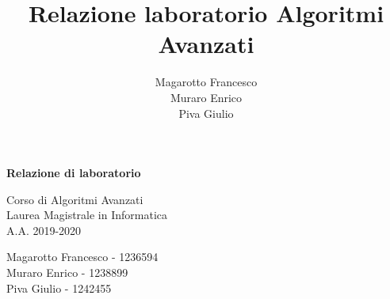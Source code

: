 \documentclass[a4paper]{article}
\title{Relazione laboratorio Algoritmi Avanzati}
\author{Magarotto Francesco\\Muraro Enrico\\Piva Giulio}
\begin{document}
\begin{titlepage}
  \vspace*{5cm}
  \begin{center}
    \Large\bfseries
    Relazione di laboratorio
  \end{center}
  \begin{center}
    \large
    Corso di Algoritmi Avanzati\\
    Laurea Magistrale in Informatica\\A.A. 2019-2020
  \end{center}
  \vspace{4cm plus 1fill}
  \begin{flushleft}
    \large
    Magarotto Francesco - 1236594\\Muraro Enrico - 1238899 \\Piva Giulio - 1242455
  \end{flushleft}
\end{titlepage}
\newpage



\newpage

\end{document}
